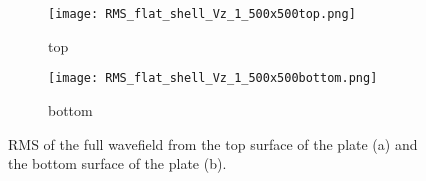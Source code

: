 \begin{figure} [h!]
	\centering
	\begin{subfigure}[b]{0.47\textwidth}
		\centering
		\texttt{[image: RMS\_flat\_shell\_Vz\_1\_500x500top.png]}
		\caption{top}
		\label{fig:rmstop}
	\end{subfigure}
	\hfill
	\begin{subfigure}[b]{0.47\textwidth}
		\centering
		\texttt{[image: RMS\_flat\_shell\_Vz\_1\_500x500bottom.png]}
		\caption{bottom}
		\label{fig:rmsbottom}
	\end{subfigure}
	\caption{RMS of the full wavefield from the top surface of the plate (a) and the bottom surface of the plate (b).}
\label{fig:rms}
\end{figure} 